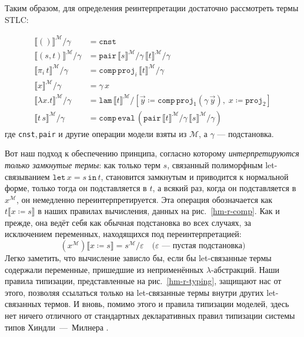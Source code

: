 Таким образом, для определения реинтерпретации
достаточно рассмотреть термы STLC:

\begin{definition}
    \begin{align}{}
        \llbracket()\rrbracket^\mathcal{M}/\gamma &=
        \mathtt{cnst}
        \\
        \llbracket(s,t)\rrbracket^\mathcal{M}/\gamma &=
        \mathtt{pair}
        \,\llbracket s\rrbracket^\mathcal{M}/
        \gamma
        \,\llbracket t\rrbracket^\mathcal{M}/
        \gamma
        \\
        \llbracket\pi_i\,t\rrbracket^\mathcal{M}/\gamma
        &=\mathtt{comp}\,\mathtt{proj}_i\,\llbracket
        t\rrbracket^\mathcal{M}/\gamma
        \\
        \llbracket x\rrbracket^\mathcal{M}/\gamma &=
        \gamma\,x
        \\
        \llbracket\lambda x.t\rrbracket^\mathcal{M}/
        \gamma &= \mathtt{lam}\,\llbracket t
        \rrbracket^\mathcal{M}/\left[
        \vec{y}\coloneqq\mathtt{comp}\,
        \mathtt{proj}_1(\gamma\,\vec{y}),\;
        x\coloneqq\mathtt{proj}_2
        \right]
        \\
        \llbracket t\,s\rrbracket^\mathcal{M}/\gamma &=
        \mathtt{comp}\,\mathtt{eval}\,\left(
        \mathtt{pair}
        \,\llbracket t\rrbracket^\mathcal{M}/
        \gamma
        \,\llbracket s\rrbracket^\mathcal{M}/
        \gamma
        \right)
    \end{align}
    где \texttt{cnst},\,\texttt{pair} и другие операции
    модели взяты из $\mathcal{M}$, а $\gamma$ ---
    подстановка.
\end{definition}

Вот наш подход к обеспечению принципа, согласно
которому \textit{интерпретируются только замкнутые
термы}: как только терм $s$, связанный полиморфным
let-связыванием $\mathtt{let}\,x=s\,\mathtt{in}\,t$,
становится замкнутым и приводится к нормальной форме,
только тогда он подставляется в $t$, а всякий раз,
когда он подставляется в $x^\mathcal{M}$, он немедленно
переинтерпретируется. Эта операция обозначается как
$t\llbracket x\coloneqq s\rrbracket$ в наших правилах
вычисления, данных на рис.~\ref{hm-r-comp}. Как и
прежде, она ведёт себя как обычная подстановка во всех
случаях, за исключением переменных, находящихся под
переинтерпретацией:
\[
\left(x^\mathcal{M}\right)\llbracket x\coloneqq s
\rrbracket = s^\mathcal{M}/\varepsilon
\quad\text{($\varepsilon$~— пустая подстановка)}
\]
Легко заметить, что вычисление зависло бы, если бы
let-связанные термы содержали переменные, пришедшие из
неприменённых $\lambda$-абстракций. Наши правила
типизации, представленные на рис.~\ref{hm-r-typing},
защищают нас от этого, позволяя ссылаться только на
let-связанные термы внутри других let-связанных термов.
И вновь, помимо этого и правила типизации моделей,
здесь нет ничего отличного от стандартных декларативных
правил типизации системы типов Хиндли~---~Милнера
\cite{Clement:ML1986}.

